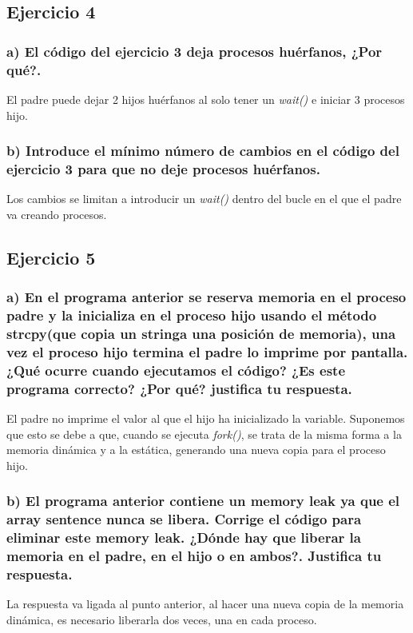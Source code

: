 \documentclass[]{article}
\begin{document}
\subsection*{Ejercicio 4}
\subsubsection*{a) El código del ejercicio 3 deja procesos huérfanos, ¿Por qué?.}
El padre puede dejar 2 hijos huérfanos al solo tener un \textit{wait()} e iniciar 3 procesos hijo.

\subsubsection*{b) Introduce el mínimo número de cambios en el código del ejercicio 3 para que no deje procesos huérfanos.}
Los cambios se limitan a introducir un \textit{wait()} dentro del bucle en el que el padre va creando procesos.

\subsection*{Ejercicio 5}
\subsubsection*{a) En el programa anterior se reserva memoria en el proceso padre y la inicializa en el proceso hijo usando el método strcpy(que copia un stringa una posición de memoria), una vez el proceso hijo termina el padre lo imprime por pantalla. ¿Qué ocurre cuando ejecutamos el código? ¿Es este programa correcto? ¿Por qué? justifica tu respuesta.}
El padre no imprime el valor al que el hijo ha inicializado la variable. Suponemos que esto se debe a que, cuando se ejecuta \textit{fork()}, se trata de la misma forma a la memoria dinámica y a la estática, generando una nueva copia para el proceso hijo.

\subsubsection*{b) El programa anterior contiene un memory leak ya que el array sentence nunca se libera. Corrige el código para eliminar este memory leak. ¿Dónde hay que liberar la memoria en el padre, en el hijo o en ambos?. Justifica tu respuesta.}
La respuesta va ligada al punto anterior, al hacer una nueva copia de la memoria dinámica, es necesario liberarla dos veces, una en cada proceso.
\end{document}

